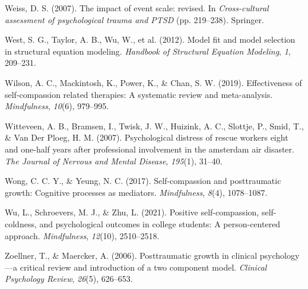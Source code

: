 \documentclass[
  man]{apa7}
\newlength{\cslhangindent}
\newlength{\cslentryspacingunit} %
\newenvironment{CSLReferences}[2] %
 {%
  \setlength{\parindent}{0pt}
  \ifodd #1
  \let\oldpar\par
  \def\par{\hangindent=\cslhangindent\oldpar}
  \fi
  \setlength{\parskip}{#2\cslentryspacingunit}
 }%
 {}
\begin{document}
\begin{CSLReferences}{1}{0}
\leavevmode{}%
Weiss, D. S. (2007). The impact of event scale: revised. In \emph{Cross-cultural assessment of psychological trauma and PTSD} (pp. 219--238). Springer.

\leavevmode{}%
West, S. G., Taylor, A. B., Wu, W., et al. (2012). Model fit and model selection in structural equation modeling. \emph{Handbook of Structural Equation Modeling}, \emph{1}, 209--231.

\leavevmode{}%
Wilson, A. C., Mackintosh, K., Power, K., \& Chan, S. W. (2019). Effectiveness of self-compassion related therapies: A systematic review and meta-analysis. \emph{Mindfulness}, \emph{10}(6), 979--995.

\leavevmode{}%
Witteveen, A. B., Bramsen, I., Twisk, J. W., Huizink, A. C., Slottje, P., Smid, T., \& Van Der Ploeg, H. M. (2007). Psychological distress of rescue workers eight and one-half years after professional involvement in the amsterdam air disaster. \emph{The Journal of Nervous and Mental Disease}, \emph{195}(1), 31--40.

\leavevmode{}%
Wong, C. C. Y., \& Yeung, N. C. (2017). Self-compassion and posttraumatic growth: Cognitive processes as mediators. \emph{Mindfulness}, \emph{8}(4), 1078--1087.

\leavevmode{}%
Wu, L., Schroevers, M. J., \& Zhu, L. (2021). Positive self-compassion, self-coldness, and psychological outcomes in college students: A person-centered approach. \emph{Mindfulness}, \emph{12}(10), 2510--2518.

\leavevmode{}%
Zoellner, T., \& Maercker, A. (2006). Posttraumatic growth in clinical psychology---a critical review and introduction of a two component model. \emph{Clinical Psychology Review}, \emph{26}(5), 626--653.

\end{CSLReferences}
\end{document}
